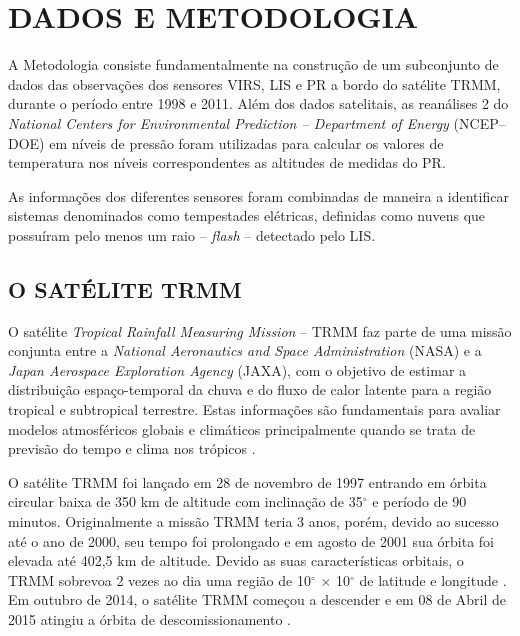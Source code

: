 \chapter{DADOS E METODOLOGIA}
\label{metodologia}

A Metodologia consiste fundamentalmente na construção de um subconjunto de dados das observações dos sensores VIRS, LIS e PR a bordo do satélite TRMM, durante o período entre 1998 e 2011. Além dos dados satelitais, as reanálises 2 do \textit{National Centers for Environmental Prediction -- Department of Energy
} (NCEP--DOE) em níveis de pressão foram utilizadas para calcular os valores de temperatura nos níveis correspondentes as altitudes de medidas do PR.


As informações dos diferentes sensores foram combinadas de maneira a identificar sistemas denominados como tempestades elétricas, definidas como nuvens que possuíram pelo menos um raio -- \textit{flash} -- detectado pelo LIS. 


\section{O SATÉLITE TRMM}
\label{metodologiaTRMM}

O satélite \textit{Tropical Rainfall Measuring Mission} -- TRMM  faz parte de uma missão conjunta entre a \textit{National Aeronautics and Space Administration} (NASA) e a \textit{Japan Aerospace Exploration Agency} (JAXA),  com o objetivo de estimar a distribuição espaço-temporal da chuva e do fluxo de calor latente para a região tropical e subtropical terrestre. Estas informações são fundamentais para avaliar modelos atmosféricos globais e climáticos principalmente quando se trata de previsão do tempo e clima nos trópicos \cite{kummerok1998,simpson1988}.

  

O satélite TRMM foi lançado em 28 de novembro de 1997 entrando em órbita circular baixa de 350 km de altitude com inclinação de 35$^{\circ}$ e período de 90 minutos. Originalmente a missão TRMM teria 3 anos, porém, devido ao sucesso até o ano de 2000, seu tempo foi prolongado e em agosto de 2001 sua órbita foi elevada até 402,5 km de altitude. Devido as suas características orbitais, o TRMM sobrevoa 2 vezes ao dia uma região de 10$^{\circ}$ $\times$ 10$^{\circ}$ de latitude e longitude \cite{simpson1988}. Em outubro de 2014, o satélite TRMM começou a descender e em 08 de Abril de 2015 atingiu a órbita de descomissionamento \cite{TRMMgoodbye,TRMMend}.

